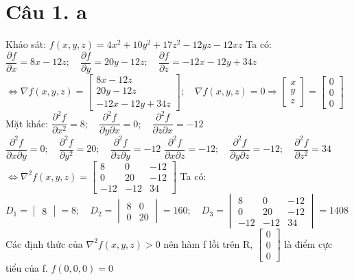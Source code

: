 \documentclass[11pt]{article}
\begin{document}
\section*{Câu 1. a}
Khảo sát: $ f(x, y, z) = 4x^2 + 10y^2 + 17z^2 - 12yz - 12xz $
\newline Ta có: $ \dfrac{\partial f}{\partial x} = 8x - 12z; \quad \dfrac{\partial f}{\partial y} = 20y - 12z; \quad \dfrac{\partial f}{\partial z} = -12x -12y + 34z $
\newline $ \Leftrightarrow \nabla f(x, y, z) = \begin{bmatrix}
    8x - 12z \\
    20y - 12z \\
    -12x - 12y + 34z
\end{bmatrix}; \quad \nabla f(x, y, z) = 0 \Rightarrow \begin{bmatrix}
    x \\ y \\ z
\end{bmatrix} = \begin{bmatrix}
    0 \\ 0 \\ 0
\end{bmatrix} $
\newline Mặt khác:
\newline $ \dfrac{\partial^2 f}{\partial x^2} = 8; \quad \dfrac{\partial^2 f}{\partial y \partial x} = 0; \quad \dfrac{\partial^2 f}{\partial z \partial x} = -12 $
\newline $ \dfrac{\partial^2 f}{\partial x \partial y} = 0; \quad \dfrac{\partial^2 f}{\partial y^2} = 20; \quad \dfrac{\partial^2 f}{\partial z \partial y} = -12 $
\newline $ \dfrac{\partial^2 f}{\partial x \partial z} = -12; \quad \dfrac{\partial^2 f}{\partial y \partial z} = -12; \quad \dfrac{\partial^2 f}{\partial z^2} = 34 $
\newline $ \Leftrightarrow \nabla^2 f(x, y, z) = \begin{bmatrix}
    8 & 0 & -12 \\
    0 & 20 & -12 \\
    -12 & -12 & 34
\end{bmatrix} $
\newline Ta có: $ D_1 = \begin{vmatrix} 8 \end{vmatrix} = 8; \quad D_2 = \begin{vmatrix}
    8 & 0 \\
    0 & 20
\end{vmatrix} = 160; \quad D_3 = \begin{vmatrix}
    8 & 0 & -12 \\
    0 & 20 & -12 \\
    -12 & -12 & 34
\end{vmatrix} = 1408 $
\newline Các định thức của $ \nabla^2 f(x, y, z) > 0 $ nên hàm f lồi trên R, $ \begin{bmatrix} 0 \\ 0 \\ 0 \end{bmatrix} $ là điểm cực tiểu của f. $ f(0, 0, 0) = 0 $
\end{document}
